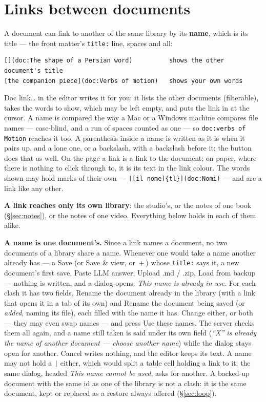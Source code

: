 \documentclass[11pt,oneside]{report}
\newcommand{\key}[1]{\textsf{\small\fbox{#1}}}
\newcommand{\menu}[1]{\textsf{#1}}
\begin{document}
\section{Links between documents}
\label{sec:doclinks}

A document can link to another of the same library by its \textbf{name},
which is its title --- the front matter's \texttt{title:} line, spaces and
all:

\begin{lstlisting}
[](doc:The shape of a Persian word)          shows the other document's title
[the companion piece](doc:Verbs of motion)   shows your own words
\end{lstlisting}

\noindent \menu{Doc link\ldots} in the editor writes it for you: it lists the
other documents (filterable), takes the words to show, which may be left
empty, and puts the link in at the cursor. A name is compared the way a Mac
or a Windows machine compares file names --- case-blind, and a run of spaces
counted as one --- so \texttt{doc:verbs of Motion} reaches it too. A
parenthesis inside a name is written as it is when it pairs up, and a lone
one, or a backslash, with a backslash before it; the button does that as
well. On the page a link is a link to the document; on paper, where there is
nothing to click through to, it is its text in the link colour. The words
shown may hold marks of their own --- \texttt{[[il nome]\{tl\}](doc:Nomi)}
--- and are a link like any other.

\textbf{A link reaches only its own library}: the studio's, or the notes of
one book (\S\ref{sec:notes}), or the notes of one video. Everything below
holds in each of them alike.

\textbf{A name is one document's.} Since a link names a document, no two
documents of a library share a name. Whenever one would take a name another
already has --- a \menu{Save} (or \menu{Save \& view}, or
\key{Ctrl}\,+\,\key{S}) whose \texttt{title:} says it, a new document's first
save, \menu{Paste LLM answer}, \menu{Upload .md / .zip}, \menu{Load from
backup} --- nothing is written, and a dialog opens: \emph{This name is
already in use}. For each clash it has two fields, \menu{Rename the document
already in the library} (with a link that opens it in a tab of its own) and
\menu{Rename the document being saved} (or \emph{added}, naming its file),
each filled with the name it has. Change either, or both --- they may even
swap names --- and press \menu{Use these names}. The server checks them all
again, and a name still taken is said under its own field (\emph{``X'' is
already the name of another document --- choose another name}) while the
dialog stays open for another. \menu{Cancel} writes nothing, and the editor
keeps its text. A name may not hold a \texttt{|} either, which would split a
table cell holding a link to it; the same dialog, headed \emph{This name
cannot be used}, asks for another. A backed-up document with the same id as
one of the library is not a clash: it is the same document, kept or replaced
as a restore always offered (\S\ref{sec:loop}).
\end{document}
